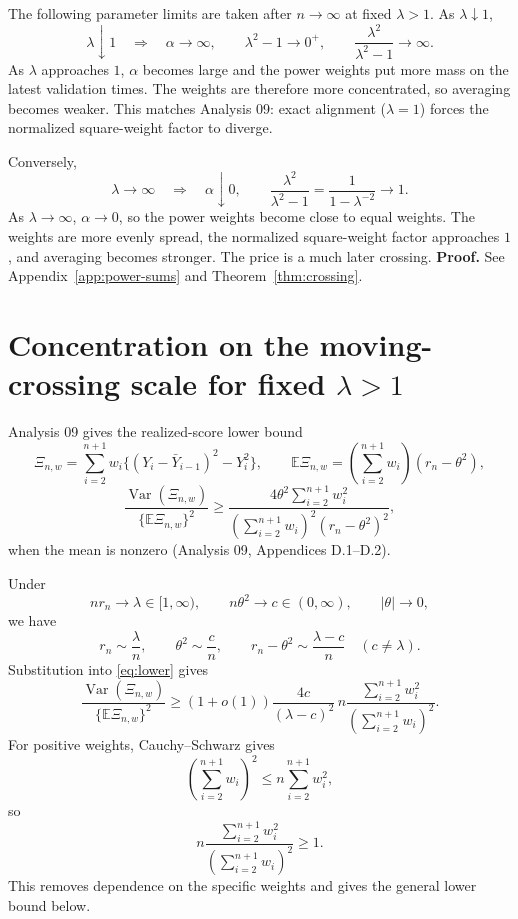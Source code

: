 \documentclass[11pt]{article}
\theoremstyle{definition}
\begin{document}
The following parameter limits are taken after $n\to\infty$ at fixed
$\lambda>1$. As $\lambda\downarrow1$,
\[
\lambda\downarrow1\quad\Longrightarrow\quad\alpha\to\infty,
\qquad \lambda^2-1\to0^+,
\qquad
\frac{\lambda^2}{\lambda^2-1}\to\infty.
\]
As $\lambda$ approaches $1$, $\alpha$ becomes large and the power
weights put more mass on the latest validation times. The weights are
therefore more concentrated, so averaging becomes weaker. This matches
Analysis 09: exact alignment ($\lambda=1$) forces the normalized
square-weight factor to diverge.

Conversely,
\[
\lambda\to\infty\quad\Longrightarrow\quad\alpha\downarrow0,
\qquad
\frac{\lambda^2}{\lambda^2-1}
=\frac1{1-\lambda^{-2}}\longrightarrow1.
\]
As $\lambda\to\infty$, $\alpha\to0$, so the power weights become close
to equal weights. The weights are more evenly spread, the normalized
square-weight factor approaches $1$, and averaging becomes stronger.
The price is a much later crossing.
\textbf{Proof.} See Appendix~\ref{app:power-sums} and
Theorem~\ref{thm:crossing}.

\section{Concentration on the moving-crossing scale for fixed $\lambda>1$}

Analysis 09 gives the realized-score lower bound
\[
\Xi_{n,w}=\sum_{i=2}^{n+1}w_i
\{(Y_i-\bar Y_{i-1})^2-Y_i^2\},
\qquad
\mathbb E\Xi_{n,w}=\left(\sum_{i=2}^{n+1}w_i\right)(r_n-\theta^2),
\]
\begin{equation}\label{eq:lower}
\frac{\operatorname{Var}(\Xi_{n,w})}{\{\mathbb E\Xi_{n,w}\}^2}
\ge\frac{4\theta^2\sum_{i=2}^{n+1}w_i^2}
{\left(\sum_{i=2}^{n+1}w_i\right)^2(r_n-\theta^2)^2},
\end{equation}
when the mean is nonzero (Analysis 09, Appendices D.1--D.2).

Under
\[
nr_n\to\lambda\in[1,\infty),\qquad
n\theta^2\to c\in(0,\infty),\qquad |\theta|\to0,
\]
we have
\[
r_n\sim\frac{\lambda}{n},\qquad \theta^2\sim\frac cn,
\qquad r_n-\theta^2\sim\frac{\lambda-c}{n}\quad(c\ne\lambda).
\]
Substitution into \eqref{eq:lower} gives
\[
\frac{\operatorname{Var}(\Xi_{n,w})}{\{\mathbb E\Xi_{n,w}\}^2}
\ge(1+o(1))\frac{4c}{(\lambda-c)^2}\,
n\frac{\sum_{i=2}^{n+1}w_i^2}
{\left(\sum_{i=2}^{n+1}w_i\right)^2}.
\]
For positive weights, Cauchy--Schwarz gives
\[
\left(\sum_{i=2}^{n+1}w_i\right)^2
\le n\sum_{i=2}^{n+1}w_i^2,
\]
so
\[
n\frac{\sum_{i=2}^{n+1}w_i^2}
{\left(\sum_{i=2}^{n+1}w_i\right)^2}\ge1.
\]
This removes dependence on the specific weights and gives the general
lower bound below.
\end{document}
